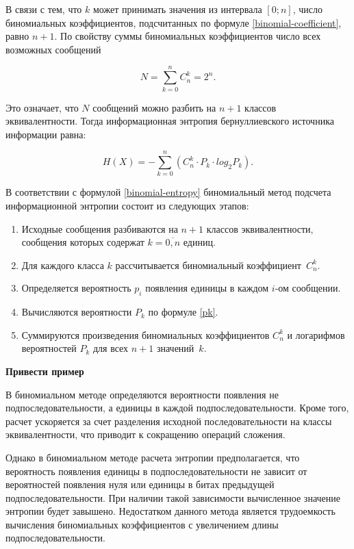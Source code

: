 В связи с тем, что $k$ может принимать значения из интервала $[0; n]$, число биномиальных коэффициентов, подсчитанных по формуле \ref{binomial-coefficient}, равно $n + 1$. По свойству суммы биномиальных коэффициентов число всех возможных сообщений

\begin{equation}
	N = \sum_{k = 0}^n C_{n}^k = 2^n.
\end{equation}

Это означает, что $N$ сообщений можно разбить на $n + 1$ классов эквивалентности. Тогда информационная энтропия бернуллиевского источника информации равна:

\begin{equation}\label{binomial-entropy}
	H(X) = -\sum_{k = 0}^n (C_{n}^k \cdot P_{k} \cdot log_{2}P_{k}).
\end{equation}

В соответствии с формулой \ref{binomial-entropy} биномиальный метод подсчета информационной энтропии состоит из следующих этапов:

\begin{enumerate}
	\item Исходные сообщения разбиваются на $n + 1$ классов эквивалентности, сообщения которых содержат $k = \overline{0, n}$ единиц.
	\item Для каждого класса $k$ рассчитывается биномиальный коэффициент~$C_{n}^k$.
	\item Определяется вероятность $p_{i}$ появления единицы в каждом $i$-ом сообщении.
	\item Вычисляются вероятности $P_{k}$ по формуле \ref{pk}.
	\item Суммируются произведения биномиальных коэффициентов $C_{n}^k$ и логарифмов вероятностей $P_{k}$ для всех $n + 1$ значений~$k$.
\end{enumerate}

\textbf{Привести пример}

В биномиальном методе определяются вероятности появления не подпоследовательности, а единицы в каждой подпоследовательности. Кроме того, расчет ускоряется за счет разделения исходной последовательности на классы эквивалентности, что приводит к сокращению операций сложения.

Однако в биномиальном методе расчета энтропии предполагается, что вероятность появления единицы в подпоследовательности не зависит от вероятностей появления нуля или единицы в битах предыдущей подпоследовательности. При наличии такой зависимости вычисленное значение энтропии будет завышено. Недостатком данного метода является трудоемкость вычисления биномиальных коэффициентов с увеличением длины подпоследовательности.
